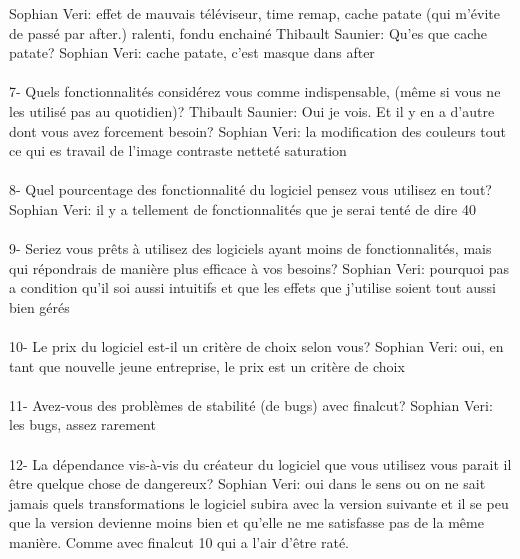 Sophian Veri: effet de mauvais téléviseur, time remap, cache patate (qui m'évite
de passé par after.) ralenti, fondu enchainé
Thibault Saunier: Qu'es que cache patate?
Sophian Veri: cache patate, c'est masque dans after

\paragraph{}
7-  Quels fonctionnalités considérez vous comme indispensable, (même si vous
ne les utilisé pas au quotidien)?
Thibault Saunier: Oui je vois. Et il y en a d'autre dont vous avez forcement besoin?
Sophian Veri: la modification des couleurs  tout ce qui es travail de
l'image contraste netteté saturation

\paragraph{}
8- Quel pourcentage des fonctionnalité du logiciel pensez vous utilisez
en tout?
Sophian Veri: il y a  tellement de fonctionnalités que je serai tenté
de dire 40%

\paragraph{}
9- Seriez vous prêts à utilisez des logiciels ayant moins de fonctionnalités,
mais qui répondrais de manière plus efficace à vos besoins?
Sophian Veri: pourquoi pas a condition qu'il soi aussi intuitifs et que les effets
que j'utilise soient tout aussi bien gérés

\paragraph{}
10-  Le prix du logiciel est-il un critère de choix selon vous?
Sophian Veri: oui, en tant que nouvelle jeune entreprise, le prix est
un critère de choix

\paragraph{}
11- Avez-vous des problèmes de stabilité (de bugs) avec finalcut?
Sophian Veri: les bugs, assez rarement

\paragraph{}
12- La dépendance vis-à-vis du créateur du logiciel que vous utilisez
vous parait il être quelque chose de dangereux?
Sophian Veri: oui dans le sens ou on ne sait jamais quels transformations le
logiciel subira avec la version suivante et il se peu que la version devienne
moins bien et qu'elle ne me satisfasse pas de la même manière. Comme avec
finalcut 10 qui a l'air d'être raté.

